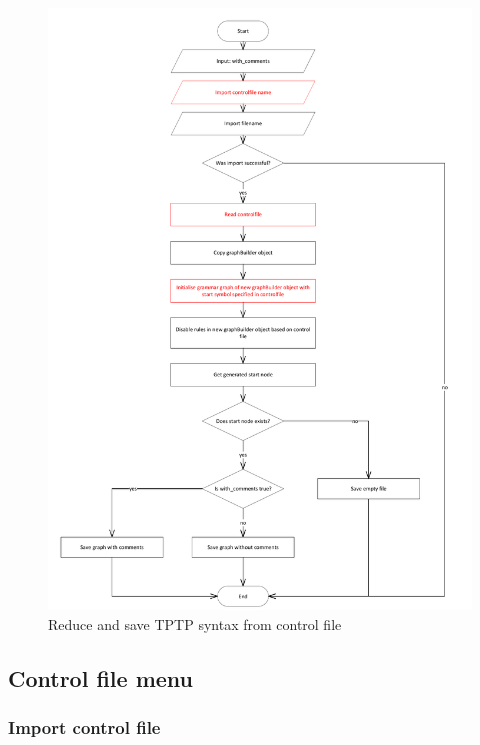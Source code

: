 \begin{figure}[H]
\includegraphics[width=1.05\textwidth]{images/implementation_reduce_and_save_tptp_syntax_control.pdf}
\caption{Reduce and save \ac{TPTP} syntax from control file}
\label{fig:ImplementationGUIReduceandSaveControl}
\end{figure}

\subsection{Control file menu}\label{sec:ImplementationGUIControlFileMenu}
\subsubsection{Import control file}\label{sec:ImplementationGUIImportControlFile}

